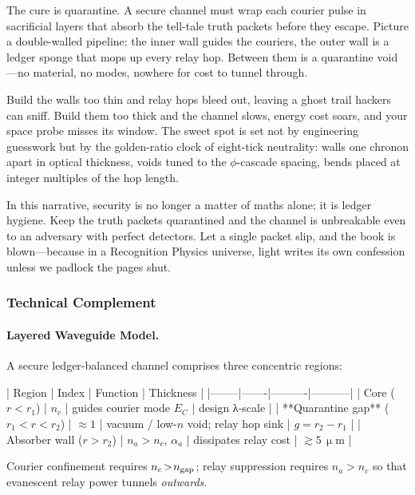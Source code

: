 \documentclass[11pt,oneside]{book}
\begin{document}
{The cure is quarantine.  
A secure channel must wrap each courier pulse in sacrificial layers
that absorb the tell-tale truth packets before they escape.  Picture a
double-walled pipeline: the inner wall guides the couriers, the outer
wall is a ledger sponge that mops up every relay hop.  Between them is
a quarantine void—no material, no modes, nowhere for cost to tunnel
through.

Build the walls too thin and relay hops bleed out, leaving a ghost
trail hackers can sniff.  Build them too thick and the channel slows,
energy cost soars, and your space probe misses its window.  The sweet
spot is set not by engineering guesswork but by the golden-ratio clock
of eight-tick neutrality: walls one chronon apart in optical
thickness, voids tuned to the \(\phi\)-cascade spacing, bends placed
at integer multiples of the hop length.  

In this narrative, security is no longer a matter of maths alone; it
is ledger hygiene.  Keep the truth packets quarantined and the channel
is unbreakable even to an adversary with perfect detectors.  Let a
single packet slip, and the book is blown—because in a Recognition
Physics universe, light writes its own confession unless we padlock
the pages shut.



\subsubsection*{Technical Complement}

\paragraph{Layered Waveguide Model.}
A secure ledger-balanced channel comprises three concentric regions:  

| Region | Index | Function | Thickness |
|--------|-------|----------|-----------|
| Core ($r<r_{1}$) | $n_{c}$ | guides courier mode $E_{C}$ | design λ-scale |
| **Quarantine gap** ($r_{1}\!<\!r\!<\!r_{2}$) | $\approx1$ | vacuum / low-$n$ void; relay hop sink | $g=r_{2}\!-\!r_{1}$ |
| Absorber wall ($r>r_{2}$) | $n_{a}\!>\!n_{c}$, $\alpha_{a}$ | dissipates relay cost | $\gtrsim\!5\,\upmu$m |

Courier confinement requires $n_{c}\!>\!n_{\rm gap}$; relay suppression
requires $n_{a}\!>\!n_{c}$ so that evanescent relay power
tunnels \emph{outwards}.

}
\end{document}
